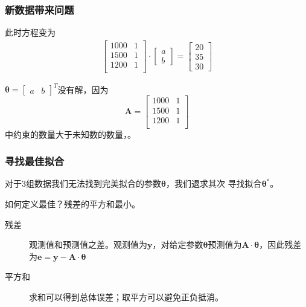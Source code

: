 \documentclass[14pt]{beamer}
\newcommand{\mat}[1]{\bm{#1}}
\renewcommand{\vec}[1]{\bm{#1}}
\newcommand{\MA}{\mat{A}}
\newcommand{\Vy}{\vec{y}}
\newcommand{\Ve}{\vec{e}}
\let\emph\relax %
\begin{document}
\begin{frame}
    \frametitle{新数据带来问题}
    \label{fr:three_zones}
    此时方程变为
    \begin{align*}
        \begin{bmatrix}
            1000 & 1\\
            1500 & 1\\
            1200 & 1\\
        \end{bmatrix}\cdot
        \begin{bmatrix}
            a \\
            b
        \end{bmatrix}=
        \begin{bmatrix}
            20\\
            35\\
            30
        \end{bmatrix}
    \end{align*}

    $\vec{\theta}=
    \begin{bmatrix}
        a & b
    \end{bmatrix}^T$没有解，因为
    \[
        \MA=    
        \begin{bmatrix}
            1000 & 1\\
            1500 & 1\\
            1200 & 1\\
        \end{bmatrix}
        \]
    中约束的数量大于未知数的数量，\emph{不可逆}。
    \end{frame}

    \begin{frame}
        \frametitle{寻找最佳拟合}
        对于3组数据我们无法找到完美拟合的参数$\vec{\theta}$，我们退求其次
        寻找\emph{最佳}拟合$\vec{\theta}^*$。
        
        如何定义最佳？残差的平方和最小。
        \begin{description}
            \item[残差] 观测值和预测值之差。观测值为$\Vy$，对给定参数$\vec{\theta}$预测值为$\MA\cdot\vec{\theta}$，因此残差为$\Ve=\Vy-\MA\cdot\vec{\theta}$ 
            \item[平方和] 求和可以得到总体误差；取平方可以避免正负抵消。 
        \end{description}
    \end{frame}
\end{document}
